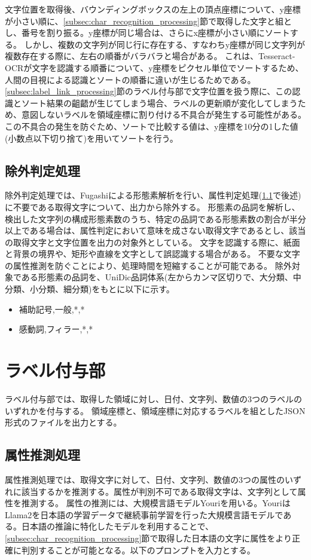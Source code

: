 文字位置を取得後、バウンディングボックスの左上の頂点座標について、y座標が小さい順に、\ref{subsec:char_recognition_processing}節で取得した文字と組とし、番号を割り振る。y座標が同じ場合は、さらにx座標が小さい順にソートする。
しかし、複数の文字列が同じ行に存在する、すなわちy座標が同じ文字列が複数存在する際に、左右の順番がバラバラと場合がある。
これは、Tesseract-OCRが文字を認識する順番について、y座標をピクセル単位でソートするため、人間の目視による認識とソートの順番に違いが生じるためである。
\ref{subsec:label_link_processing}節のラベル付与部で文字位置を扱う際に、この認識とソート結果の齟齬が生じてしまう場合、ラベルの更新順が変化してしまうため、意図しないラベルを領域座標に割り付ける不具合が発生する可能性がある。
この不具合の発生を防ぐため、ソートで比較する値は、y座標を10分の1した値(小数点以下切り捨て)を用いてソートを行う。


\subsection{除外判定処理}\label{subsec:exclusion_judgement_processing}
除外判定処理では、Fugashiによる形態素解析を行い、属性判定処理(\ref{subsec:att_prediction_processing}で後述)に不要である取得文字について、出力から除外する。
形態素の品詞を解析し、検出した文字列の構成形態素数のうち、特定の品詞である形態素数の割合が半分以上である場合は、属性判定において意味を成さない取得文字であるとし、該当の取得文字と文字位置を出力の対象外としている。
文字を認識する際に、紙面と背景の境界や、矩形や直線を文字として誤認識する場合がある。
不要な文字の属性推測を防ぐことにより、処理時間を短縮することが可能である。
除外対象である形態素の品詞を、UniDic品詞体系(左からカンマ区切りで、大分類、中分類、小分類、細分類)をもとに以下に示す。

\begin{itemize}
    \item 補助記号,一般,*,*
    \item 感動詞,フィラー,*,*
\end{itemize}


\section{ラベル付与部}\label{sec:label_link_part}
ラベル付与部では、取得した領域に対し、日付、文字列、数値の3つのラベルのいずれかを付与する。
領域座標と、領域座標に対応するラベルを組としたJSON形式のファイルを出力とする。


\subsection{属性推測処理}\label{subsec:att_prediction_processing}
属性推測処理では、取得文字に対して、日付、文字列、数値の3つの属性のいずれに該当するかを推測する。属性が判別不可である取得文字は、文字列として属性を推測する。
属性の推測には、大規模言語モデルYouriを用いる。YouriはLlama2を日本語の学習データで継続事前学習を行った大規模言語モデルである。日本語の推論に特化したモデルを利用することで、\ref{subsec:char_recognition_processing}節で取得した日本語の文字に属性をより正確に判別することが可能となる。以下のプロンプトを入力とする。\\

